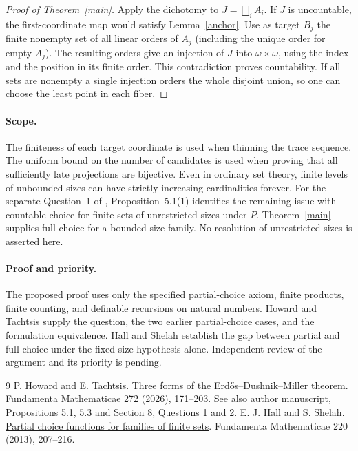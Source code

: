 \documentclass[11pt]{article}
\begin{document}
\begin{proof}[Proof of Theorem~\ref{main}]
Apply the dichotomy to $J=\bigsqcup_i A_i$. If $J$ is uncountable, the first-coordinate map would satisfy Lemma~\ref{anchor}. Use as target $B_j$ the finite nonempty set of all linear orders of $A_j$ (including the unique order for empty $A_j$). The resulting orders give an injection of $J$ into $\omega\times\omega$, using the index and the position in its finite order. This contradiction proves countability. If all sets are nonempty a single injection orders the whole disjoint union, so one can choose the least point in each fiber.
\end{proof}

\paragraph{Scope.} The finiteness of each target coordinate is used when thinning the trace sequence. The uniform bound on the number of candidates is used when proving that all sufficiently late projections are bijective. Even in ordinary set theory, finite levels of unbounded sizes can have strictly increasing cardinalities forever. For the separate Question~1 of \cite{ht}, Proposition~5.1(1) identifies the remaining issue with countable choice for finite sets of unrestricted sizes under $P$. Theorem~\ref{main} supplies full choice for a bounded-size family. No resolution of unrestricted sizes is asserted here.

\paragraph{Proof and priority.} The proposed proof uses only the specified partial-choice axiom, finite products, finite counting, and definable recursions on natural numbers. Howard and Tachtsis supply the question, the two earlier partial-choice cases, and the formulation equivalence. Hall and Shelah establish the gap between partial and full choice under the fixed-size hypothesis alone. Independent review of the argument and its priority is pending.
\begin{thebibliography}{9}
 P. Howard and E. Tachtsis. \href{https://doi.org/10.4064/fm250514-20-7}{Three forms of the Erdős--Dushnik--Miller theorem}. Fundamenta Mathematicae 272 (2026), 171--203. See also \href{https://arxiv.org/abs/2410.18229}{author manuscript}, Propositions 5.1, 5.3 and Section 8, Questions 1 and 2.
 E. J. Hall and S. Shelah. \href{https://doi.org/10.4064/fm220-3-2}{Partial choice functions for families of finite sets}. Fundamenta Mathematicae 220 (2013), 207--216.
\end{thebibliography}
\end{document}
